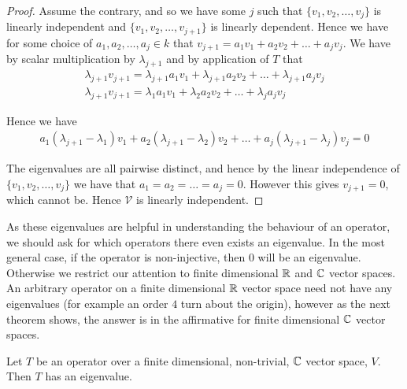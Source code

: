 \documentclass[]{article}
\begin{document}
\begin{proof}
		Assume the contrary, and so we have some $j$ such that $\{v_1, v_2, \ldots, v_j\}$ is linearly independent and $\{v_1, v_2, \ldots, v_{j+1}\}$ is linearly dependent. Hence we have for some choice of $a_1, a_2, \ldots, a_j \in k$ that $v_{j+1} = a_1 v_1 + a_2 v_2 + \ldots + a_j v_j$. We have by scalar multiplication by $\lambda_{j+1}$ and by application of $T$ that
		\begin{align*}
				\lambda_{j+1} v_{j+1} = \lambda_{j+1} a_1 v_1 + \lambda_{j+1} a_2 v_2 + \ldots + \lambda_{j+1} a_j v_j \\
				\lambda_{j+1} v_{j+1} = \lambda_1 a_1 v_1 + \lambda_2 a_2 v_2 + \ldots + \lambda_j a_j v_j
		\end{align*}

		Hence we have 
		\begin{align*}
				a_1 (\lambda_{j+1} - \lambda_1) v_1 + a_2 (\lambda_{j+1} - \lambda_2) v_2 + \ldots + a_j (\lambda_{j+1} - \lambda_j) v_j = 0
		\end{align*}

		The eigenvalues are all pairwise distinct, and hence by the linear independence of $\{v_1, v_2, \ldots, v_j\}$ we have that $a_1 = a_2 = \ldots = a_j = 0$. However this gives $v_{j+1} = 0$, which cannot be. Hence $\mathcal{V}$ is linearly independent. 
\end{proof}

As these eigenvalues are helpful in understanding the behaviour of an operator, we should ask for which operators there even exists an eigenvalue. In the most general case, if the operator is non-injective, then $0$ will be an eigenvalue. Otherwise we restrict our attention to finite dimensional $\mathbb{R}$ and $\mathbb{C}$ vector spaces. An arbitrary operator on a finite dimensional $\mathbb{R}$ vector space need not have any eigenvalues (for example an order $4$ turn about the origin), however as the next theorem shows, the answer is in the affirmative for finite dimensional $\mathbb{C}$ vector spaces.

\begin{thm}
		Let $T$ be an operator over a finite dimensional, non-trivial, $\mathbb{C}$ vector space, $V$. Then $T$ has an eigenvalue.
\end{thm}
\end{document}

